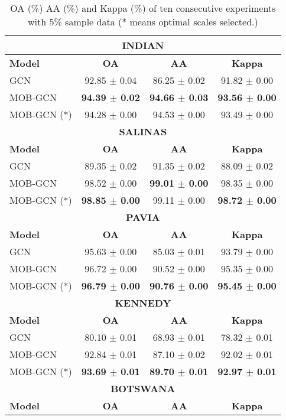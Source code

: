  
\begin{table}
\caption{OA (\%) AA (\%) and Kappa (\%) of ten consecutive experiments with 5\% sample data (* means optimal scales selected.)}
\centering
\small
\begin{tabular}{|lccc|}
\hline
\multicolumn{4}{|c|}{\textbf{INDIAN}} \\
\hline
\textbf{Model} & \textbf{OA} & \textbf{AA} & \textbf{Kappa} \\
\hline
GCN & 92.85 $\pm$ 0.04 & 86.25 $\pm$ 0.02 & 91.82 $\pm$ 0.00 \\
MOB-GCN & \textbf{94.39 $\pm$ 0.02} & \textbf{94.66 $\pm$ 0.03} & \textbf{93.56 $\pm$ 0.00} \\
MOB-GCN (*) & 94.28 $\pm$ 0.00 & 94.53 $\pm$ 0.00 & 93.49 $\pm$ 0.00 \\
\hline
\multicolumn{4}{|c|}{\textbf{SALINAS}} \\
\hline
\textbf{Model} & \textbf{OA} & \textbf{AA} & \textbf{Kappa} \\
\hline
GCN & 89.35 $\pm$ 0.02 & 91.35 $\pm$ 0.02 & 88.09 $\pm$ 0.02 \\
MOB-GCN & 98.52 $\pm$ 0.00 & \textbf{99.01 $\pm$ 0.00} & 98.35 $\pm$ 0.00 \\
MOB-GCN (*) & \textbf{98.85 $\pm$ 0.00} & 99.11 $\pm$ 0.00 & \textbf{98.72 $\pm$ 0.00} \\
\hline
\multicolumn{4}{|c|}{\textbf{PAVIA}} \\
\hline
\textbf{Model} & \textbf{OA} & \textbf{AA} & \textbf{Kappa} \\
\hline
GCN & 95.63 $\pm$ 0.00 & 85.03 $\pm$ 0.01 & 93.79 $\pm$ 0.00 \\
MOB-GCN & 96.72 $\pm$ 0.00 & 90.52 $\pm$ 0.00 & 95.35 $\pm$ 0.00 \\
MOB-GCN (*) & \textbf{96.79 $\pm$ 0.00} & \textbf{90.76 $\pm$ 0.00} & \textbf{95.45 $\pm$ 0.00} \\
\hline
\multicolumn{4}{|c|}{\textbf{KENNEDY}} \\
\hline
\textbf{Model} & \textbf{OA} & \textbf{AA} & \textbf{Kappa} \\
\hline
GCN & 80.10 $\pm$ 0.01 & 68.93 $\pm$ 0.01 & 78.32 $\pm$ 0.01 \\
MOB-GCN & 92.84 $\pm$ 0.01 & 87.10 $\pm$ 0.02 & 92.02 $\pm$ 0.01 \\
MOB-GCN (*) & \textbf{93.69 $\pm$ 0.01} & \textbf{89.70 $\pm$ 0.01} & \textbf{92.97 $\pm$ 0.01} \\
\hline
\multicolumn{4}{|c|}{\textbf{BOTSWANA}} \\
\hline
\textbf{Model} & \textbf{OA} & \textbf{AA} & \textbf{Kappa} \\

\end{tabular}
\end{table}
